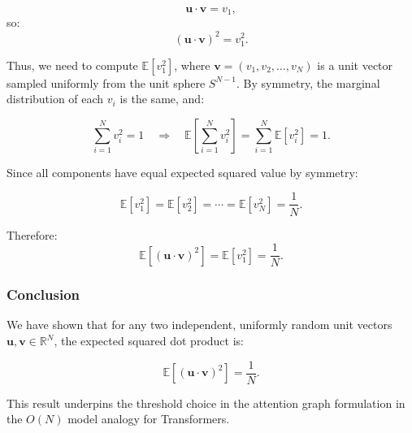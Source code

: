 \documentclass[12pt]{article}
\begin{document}
\[
\mathbf{u} \cdot \mathbf{v} = v_1,
\]
so:
\[
(\mathbf{u} \cdot \mathbf{v})^2 = v_1^2.
\]

Thus, we need to compute \( \mathbb{E}[v_1^2] \), where \( \mathbf{v} = (v_1, v_2, \dots, v_N) \) is a unit vector sampled uniformly from the unit sphere \( S^{N-1} \). By symmetry, the marginal distribution of each \( v_i \) is the same, and:

\[
\sum_{i=1}^{N} v_i^2 = 1 \quad \Rightarrow \quad \mathbb{E}\left[ \sum_{i=1}^{N} v_i^2 \right] = \sum_{i=1}^{N} \mathbb{E}[v_i^2] = 1.
\]

Since all components have equal expected squared value by symmetry:

\[
\mathbb{E}[v_1^2] = \mathbb{E}[v_2^2] = \cdots = \mathbb{E}[v_N^2] = \frac{1}{N}.
\]

Therefore:
\[
\mathbb{E}\left[ (\mathbf{u} \cdot \mathbf{v})^2 \right] = \mathbb{E}[v_1^2] = \frac{1}{N}.
\]

\subsubsection*{Conclusion}
We have shown that for any two independent, uniformly random unit vectors \( \mathbf{u}, \mathbf{v} \in \mathbb{R}^N \), the expected squared dot product is:

\[
\boxed{ \mathbb{E}\left[ (\mathbf{u} \cdot \mathbf{v})^2 \right] = \frac{1}{N} }.
\]

This result underpins the threshold choice in the attention graph formulation in the $O(N)$ model analogy for Transformers.


\end{document}
